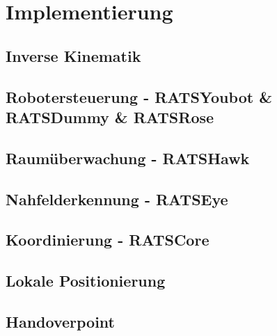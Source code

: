 \section{Implementierung}
\label{sec:impl}

\subsection{Inverse Kinematik}
\subsection{Robotersteuerung - RATSYoubot \& RATSDummy \& RATSRose}
\subsection{Raumüberwachung - RATSHawk}
\subsection{Nahfelderkennung - RATSEye}
\subsection{Koordinierung - RATSCore}
\subsection{Lokale Positionierung}
\subsection{Handoverpoint}
